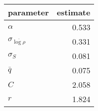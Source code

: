 
\begin{tabular}{lr}
\toprule
parameter & estimate\\
\midrule
$\alpha$ & 0.533\\
$\sigma_{\overline{\log \rho}}$ & 0.331\\
$\sigma_{S}$ & 0.081\\
$\bar{q}$ & 0.075\\
$C$ & 2.058\\
\addlinespace
$r$ & 1.824\\
\bottomrule
\end{tabular}